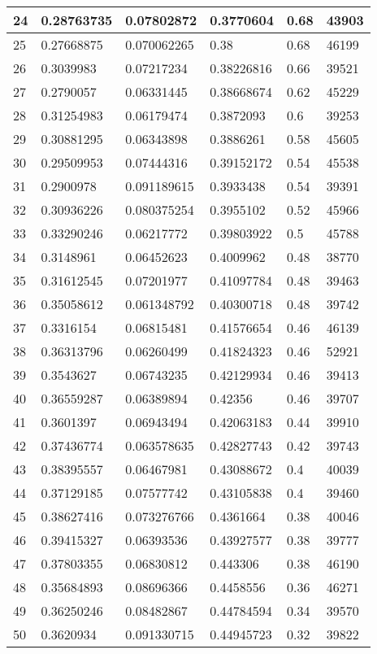 \begin{longtable}{|l|l|l|l|l|l|}
24 & 0.28763735 & 0.07802872 & 0.3770604 & 0.68 & 43903 \\ \hline 
25 & 0.27668875 & 0.070062265 & 0.38 & 0.68 & 46199 \\ \hline 
26 & 0.3039983 & 0.07217234 & 0.38226816 & 0.66 & 39521 \\ \hline 
27 & 0.2790057 & 0.06331445 & 0.38668674 & 0.62 & 45229 \\ \hline 
28 & 0.31254983 & 0.06179474 & 0.3872093 & 0.6 & 39253 \\ \hline 
29 & 0.30881295 & 0.06343898 & 0.3886261 & 0.58 & 45605 \\ \hline 
30 & 0.29509953 & 0.07444316 & 0.39152172 & 0.54 & 45538 \\ \hline 
31 & 0.2900978 & 0.091189615 & 0.3933438 & 0.54 & 39391 \\ \hline 
32 & 0.30936226 & 0.080375254 & 0.3955102 & 0.52 & 45966 \\ \hline 
33 & 0.33290246 & 0.06217772 & 0.39803922 & 0.5 & 45788 \\ \hline 
34 & 0.3148961 & 0.06452623 & 0.4009962 & 0.48 & 38770 \\ \hline 
35 & 0.31612545 & 0.07201977 & 0.41097784 & 0.48 & 39463 \\ \hline 
36 & 0.35058612 & 0.061348792 & 0.40300718 & 0.48 & 39742 \\ \hline 
37 & 0.3316154 & 0.06815481 & 0.41576654 & 0.46 & 46139 \\ \hline 
38 & 0.36313796 & 0.06260499 & 0.41824323 & 0.46 & 52921 \\ \hline 
39 & 0.3543627 & 0.06743235 & 0.42129934 & 0.46 & 39413 \\ \hline 
40 & 0.36559287 & 0.06389894 & 0.42356 & 0.46 & 39707 \\ \hline 
41 & 0.3601397 & 0.06943494 & 0.42063183 & 0.44 & 39910 \\ \hline 
42 & 0.37436774 & 0.063578635 & 0.42827743 & 0.42 & 39743 \\ \hline 
43 & 0.38395557 & 0.06467981 & 0.43088672 & 0.4 & 40039 \\ \hline 
44 & 0.37129185 & 0.07577742 & 0.43105838 & 0.4 & 39460 \\ \hline 
45 & 0.38627416 & 0.073276766 & 0.4361664 & 0.38 & 40046 \\ \hline 
46 & 0.39415327 & 0.06393536 & 0.43927577 & 0.38 & 39777 \\ \hline 
47 & 0.37803355 & 0.06830812 & 0.443306 & 0.38 & 46190 \\ \hline 
48 & 0.35684893 & 0.08696366 & 0.4458556 & 0.36 & 46271 \\ \hline 
49 & 0.36250246 & 0.08482867 & 0.44784594 & 0.34 & 39570 \\ \hline 
50 & 0.3620934 & 0.091330715 & 0.44945723 & 0.32 & 39822 \\ \hline 
\end{longtable}